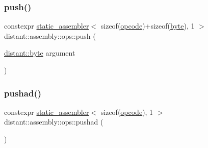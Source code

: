 \subsubsection{\texorpdfstring{push()}{push()}\hspace{0.1cm}{\footnotesize\ttfamily [2/2]}}
{\footnotesize\ttfamily constexpr \mbox{\hyperlink{classdistant_1_1assembly_1_1static__assembler}{static\+\_\+assembler}}$<$ sizeof(\mbox{\hyperlink{namespacedistant_1_1assembly_a64d7b047d9e3df1ac04919f7c4f8f6fa}{opcode}})+sizeof(\mbox{\hyperlink{namespacedistant_af9c3f04a9b855a1368d6c1a9ce28c2f4}{byte}}), 1 $>$ distant\+::assembly\+::ops\+::push (\begin{DoxyParamCaption}\item[{\mbox{\hyperlink{namespacedistant_af9c3f04a9b855a1368d6c1a9ce28c2f4}{distant\+::byte}}}]{argument }\end{DoxyParamCaption})\hspace{0.3cm}{\ttfamily [noexcept]}}

\mbox{\label{namespacedistant_1_1assembly_1_1ops_a132e54e40c3f4572daf3b807c37533f2}} 
\subsubsection{\texorpdfstring{pushad()}{pushad()}}
{\footnotesize\ttfamily constexpr \mbox{\hyperlink{classdistant_1_1assembly_1_1static__assembler}{static\+\_\+assembler}}$<$ sizeof(\mbox{\hyperlink{namespacedistant_1_1assembly_a64d7b047d9e3df1ac04919f7c4f8f6fa}{opcode}}), 1 $>$ distant\+::assembly\+::ops\+::pushad (\begin{DoxyParamCaption}{ }\end{DoxyParamCaption})\hspace{0.3cm}{\ttfamily [noexcept]}}

